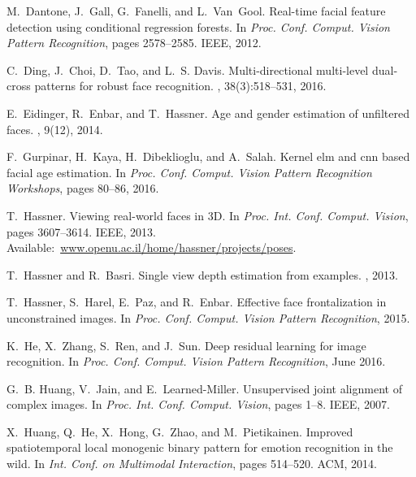 \documentclass[10pt,twocolumn,letterpaper]{article}
\begin{document}
{\begin{thebibliography}{10}
M.~Dantone, J.~Gall, G.~Fanelli, and L.~Van~Gool.
\newblock Real-time facial feature detection using conditional regression
  forests.
\newblock In {\em Proc. Conf. Comput. Vision Pattern Recognition}, pages
  2578--2585. IEEE, 2012.

C.~Ding, J.~Choi, D.~Tao, and L.~S. Davis.
\newblock Multi-directional multi-level dual-cross patterns for robust face
  recognition.
, 38(3):518--531, 2016.

E.~Eidinger, R.~Enbar, and T.~Hassner.
\newblock Age and gender estimation of unfiltered faces.
, 9(12), 2014.

F.~Gurpinar, H.~Kaya, H.~Dibeklioglu, and A.~Salah.
\newblock Kernel elm and cnn based facial age estimation.
\newblock In {\em Proc. Conf. Comput. Vision Pattern Recognition Workshops},
  pages 80--86, 2016.

T.~Hassner.
\newblock Viewing real-world faces in {3D}.
\newblock In {\em Proc. Int. Conf. Comput. Vision}, pages 3607--3614. IEEE,
  2013.
\newblock Available:~\url{www.openu.ac.il/home/hassner/projects/poses}.

T.~Hassner and R.~Basri.
\newblock Single view depth estimation from examples.
, 2013.

T.~Hassner, S.~Harel, E.~Paz, and R.~Enbar.
\newblock Effective face frontalization in unconstrained images.
\newblock In {\em Proc. Conf. Comput. Vision Pattern Recognition}, 2015.

K.~He, X.~Zhang, S.~Ren, and J.~Sun.
\newblock Deep residual learning for image recognition.
\newblock In {\em Proc. Conf. Comput. Vision Pattern Recognition}, June 2016.

G.~B. Huang, V.~Jain, and E.~Learned-Miller.
\newblock Unsupervised joint alignment of complex images.
\newblock In {\em Proc. Int. Conf. Comput. Vision}, pages 1--8. IEEE, 2007.

X.~Huang, Q.~He, X.~Hong, G.~Zhao, and M.~Pietikainen.
\newblock Improved spatiotemporal local monogenic binary pattern for emotion
  recognition in the wild.
\newblock In {\em Int. Conf. on Multimodal Interaction}, pages 514--520. ACM,
  2014.


\end{thebibliography}}
\end{document}
